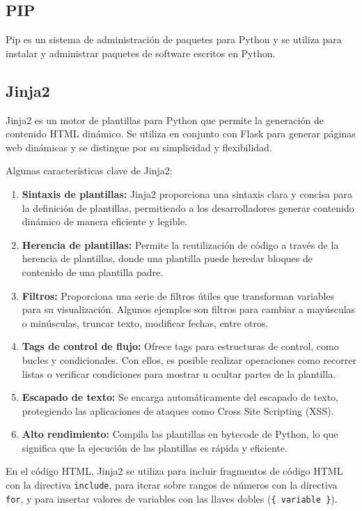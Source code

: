 \documentclass[a4paper, 12pt]{book}
\begin{document}
\subsection{PIP} 
\label{subsec:pip} 
Pip es un sistema de administración de paquetes para Python y se utiliza para instalar y administrar paquetes de software escritos en Python.
\subsection{Jinja2}
\label{subsec:jinja2} 
Jinja2 es un motor de plantillas para Python que permite la generación de contenido HTML dinámico. Se utiliza en conjunto con Flask para 
generar páginas web dinámicas y se distingue por su simplicidad y flexibilidad. 

Algunas características clave de Jinja2:

\begin{enumerate}
  \item \textbf{Sintaxis de plantillas:} Jinja2 proporciona una sintaxis clara y concisa para la definición de plantillas, permitiendo a los desarrolladores generar 
  contenido dinámico de manera eficiente y legible.
  \item \textbf{Herencia de plantillas:} Permite la reutilización de código a través de la herencia de plantillas, donde una plantilla puede heredar bloques de contenido 
  de una plantilla padre.
  \item \textbf{Filtros:} Proporciona una serie de filtros útiles que transforman variables para su visualización. Algunos ejemplos son filtros para cambiar a mayúsculas 
  o minúsculas, truncar texto, modificar fechas, entre otros.
  \item \textbf{Tags de control de flujo:} Ofrece tags para estructuras de control, como bucles y condicionales. Con ellos, es posible realizar operaciones como recorrer 
  listas o verificar condiciones para mostrar u ocultar partes de la plantilla.
  \item \textbf{Escapado de texto:} Se encarga automáticamente del escapado de texto, protegiendo las aplicaciones de ataques como Cross Site Scripting (XSS).
  \item \textbf{Alto rendimiento:} Compila las plantillas en bytecode de Python, lo que significa que la ejecución de las plantillas es rápida y eficiente.
\end{enumerate}

En el código HTML, Jinja2 se utiliza para incluir fragmentos de código HTML con la directiva \texttt{include}, para iterar sobre rangos de números con la directiva \texttt{for}, y para insertar valores de variables con las llaves dobles (\texttt{{\{ variable \}}}).
\end{document}
